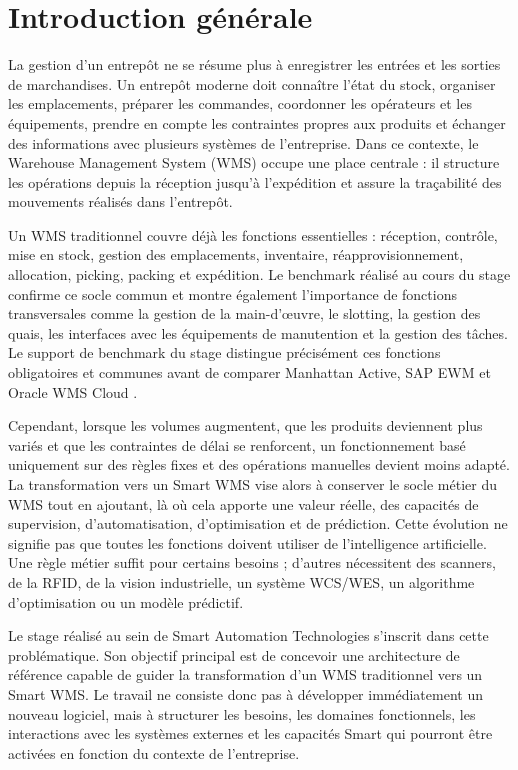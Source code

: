 \chapter*{Introduction générale}



La gestion d’un entrepôt ne se résume plus à enregistrer les entrées et les sorties de marchandises. Un entrepôt moderne doit connaître l’état du stock, organiser les emplacements, préparer les commandes, coordonner les opérateurs et les équipements, prendre en compte les contraintes propres aux produits et échanger des informations avec plusieurs systèmes de l’entreprise. Dans ce contexte, le Warehouse Management System (WMS) occupe une place centrale : il structure les opérations depuis la réception jusqu’à l’expédition et assure la traçabilité des mouvements réalisés dans l’entrepôt.


Un WMS traditionnel couvre déjà les fonctions essentielles : réception, contrôle, mise en stock, gestion des emplacements, inventaire, réapprovisionnement, allocation, picking, packing et expédition. Le benchmark réalisé au cours du stage confirme ce socle commun et montre également l’importance de fonctions transversales comme la gestion de la main-d’œuvre, le slotting, la gestion des quais, les interfaces avec les équipements de manutention et la gestion des tâches. Le support de benchmark du stage distingue précisément ces fonctions obligatoires et communes avant de comparer Manhattan Active, SAP EWM et Oracle WMS Cloud \cite{ref2}.


Cependant, lorsque les volumes augmentent, que les produits deviennent plus variés et que les contraintes de délai se renforcent, un fonctionnement basé uniquement sur des règles fixes et des opérations manuelles devient moins adapté. La transformation vers un Smart WMS vise alors à conserver le socle métier du WMS tout en ajoutant, là où cela apporte une valeur réelle, des capacités de supervision, d’automatisation, d’optimisation et de prédiction. Cette évolution ne signifie pas que toutes les fonctions doivent utiliser de l’intelligence artificielle. Une règle métier suffit pour certains besoins ; d’autres nécessitent des scanners, de la RFID, de la vision industrielle, un système WCS/WES, un algorithme d’optimisation ou un modèle prédictif.


Le stage réalisé au sein de Smart Automation Technologies s’inscrit dans cette problématique. Son objectif principal est de concevoir une architecture de référence capable de guider la transformation d’un WMS traditionnel vers un Smart WMS. Le travail ne consiste donc pas à développer immédiatement un nouveau logiciel, mais à structurer les besoins, les domaines fonctionnels, les interactions avec les systèmes externes et les capacités Smart qui pourront être activées en fonction du contexte de l’entreprise.



